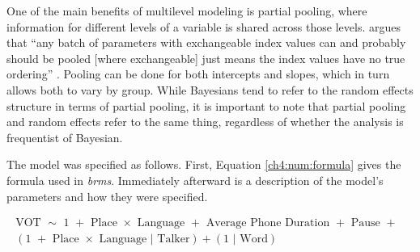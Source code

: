 One of the main benefits of multilevel modeling is partial pooling, where information for different levels of a variable is shared across those levels. \citeauthor{mcelreath_2020_sr} argues that ``any batch of parameters with exchangeable index values can and probably should be pooled [where exchangeable] just means the index values have no true ordering'' \citeyearpar[][p. 435]{mcelreath_2020_sr}. Pooling can be done for both intercepts and slopes, which in turn allows both to vary by group. While Bayesians tend to refer to the random effects structure in terms of partial pooling, it is important to note that partial pooling and random effects refer to the same thing, regardless of whether the analysis is frequentist of Bayesian. 

The model was specified as follows. First, Equation \ref{ch4:num:formula} gives the formula used in \textit{brms}. Immediately afterward is a description of the model's parameters and how they were specified. 

\begin{equation}
  \begin{aligned}\label{ch4:num:formula}
    \text{VOT } \sim \text{ 1 } + \text{ Place } \times \text{ Language } + \text{ Average Phone Duration } + \text{ Pause } + \text{ } \\
    (\text{1 } + \text{ Place } \times \text{ Language }|\text{ Talker}) + (\text{1 }| \text{ Word})
  \end{aligned}
\end{equation} 

